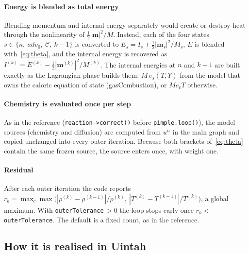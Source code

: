 \documentclass[11pt]{article}
\newcommand{\code}[1]{\texttt{\small #1}}
\begin{document}
\paragraph{Energy is blended as total energy}
Blending momentum and internal energy separately would create or destroy heat through the
nonlinearity of $\tfrac12|\mathbf m|^2/M$. Instead, each of the four states
$s\in\{n,\ adv_0,\ \mathcal C,\ k-1\}$ is converted to $E_s = I_s + \tfrac12|\mathbf m_s|^2/M_s$,
$E$ is blended with~\eqref{eq:theta}, and the internal energy is recovered as
$I^{(k)} = E^{(k)} - \tfrac12|\mathbf m^{(k)}|^2/M^{(k)}$. The internal energies at $n$ and $k-1$
are built exactly as the Lagrangian phase builds them: $M\,e_s(T,Y)$ from the model that owns
the caloric equation of state (gasCombustion), or $M c_v T$ otherwise.

\paragraph{Chemistry is evaluated once per step}
As in the reference (\code{reaction->correct()} before \code{pimple.loop()}), the model
sources (chemistry and diffusion) are computed from $u^n$ in the main graph and copied
unchanged into every outer iteration. Because both brackets of~\eqref{eq:theta} contain the
same frozen source, the source enters once, with weight one.

\paragraph{Residual}
After each outer iteration the code reports
$r_k=\max_c\max\bigl(|\rho^{(k)}-\rho^{(k-1)}|/\rho^{(k)},\ |T^{(k)}-T^{(k-1)}|/T^{(k)}\bigr)$,
a global maximum. With \code{outerTolerance}$\,>0$ the loop stops early once
$r_k<$ \code{outerTolerance}. The default is a fixed count, as in the reference.

\subsection{How it is realised in Uintah}
\end{document}
